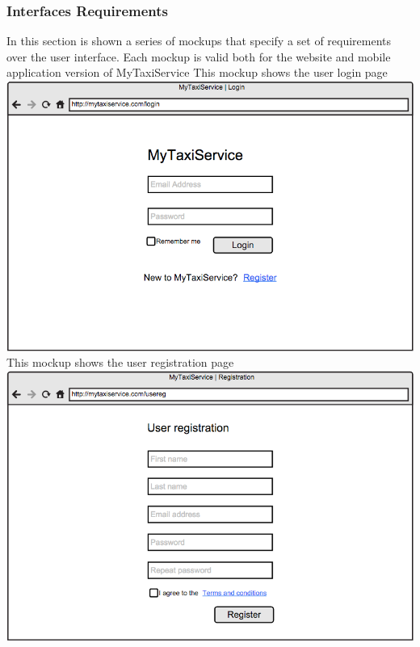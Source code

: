 \documentclass[11pt,titlepage]{article} %
\begin{document}
      \subsubsection{Interfaces Requirements}
       In this section is shown a series of mockups that specify a set of requirements over the user interface.\newline
       Each mockup is valid both for the website and mobile application version of MyTaxiService\newline
        \newline
        This mockup shows the user login page\newline
       \newline
        \includegraphics[scale=0.52]{loginInt.png}\newline
        \newpage
        \noindent
        This  mockup shows the user registration page\newline
	\newline
        \includegraphics[scale=0.52]{userRegInt.png}\newline
        \newpage
\end{document}
